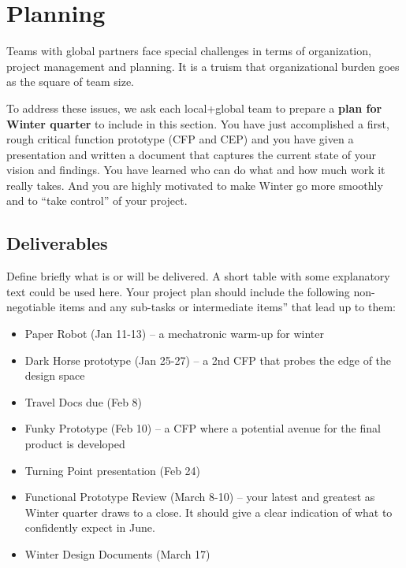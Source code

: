 \chapter{Planning}
\label{project-planning}

\begin{remark}\color{blue}
Teams with global partners face special challenges in  terms of organization, project management and planning.
It is a truism that organizational burden goes as the square of team size. 

To address these issues, we ask each local+global team to prepare a \textbf{plan for Winter quarter} to include in this section. You have just accomplished a first, rough critical function prototype (CFP and CEP) and you have given a presentation and written a document that captures the current state of your vision and findings. You have learned who can do what and how much work it really takes. And you are highly motivated to make Winter go more smoothly and to ``take control'' of your project.
\normalcolor \end{remark}

\section{Deliverables}
Define briefly what is or will be delivered. A short table with some explanatory text could be used here. Your project plan should include the following non-negotiable items and any sub-tasks or intermediate items'' that lead up to them:

\begin{itemize} \tightlist
\item Paper Robot (Jan 11-13) -- a mechatronic warm-up for winter
\item Dark Horse prototype (Jan 25-27) -- a 2nd CFP that probes the edge of the design space
\item Travel Docs due (Feb 8)
\item Funky Prototype (Feb 10) -- a CFP where a potential avenue for the final product is developed
\item Turning Point presentation (Feb 24)
\item Functional Prototype Review (March 8-10) -- your latest and greatest as Winter quarter draws to a close. It should give a clear indication of what to confidently expect in June.
\item Winter Design Documents (March 17)
\end{itemize}

